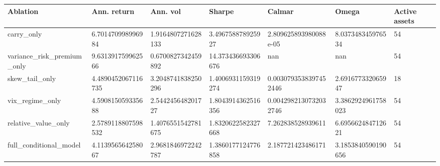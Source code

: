 \begin{tabular}{lllllll}
\toprule
Ablation & Ann. return & Ann. vol & Sharpe & Calmar & Omega & Active assets \\
\midrule
carry\_only & 6.701470998996984 & 1.9164807271628133 & 3.496758878925927 & 2.809625893980088e-05 & 8.037348345976534 & 54 \\
variance\_risk\_premium\_only & 9.631391759962566 & 0.6700827342459892 & 14.373436693306676 & nan & nan & 54 \\
skew\_tail\_only & 4.4890452067116735 & 3.2048741838250296 & 1.4006931159319274 & 0.0030793538397452446 & 2.691677332065947 & 18 \\
vix\_regime\_only & 4.590815059335688 & 2.544245648201727 & 1.8043914362516356 & 0.0042982130732032746 & 3.3862924961758023 & 54 \\
relative\_value\_only & 2.5789118807598532 & 1.4076551542781675 & 1.8320622582327668 & 7.262838528939611 & 6.695662484712621 & 54 \\
full\_conditional\_model & 4.113956564258067 & 2.9681846972242787 & 1.3860177124776858 & 2.187721423486171 & 3.1853840590190656 & 54 \\
\bottomrule
\end{tabular}
